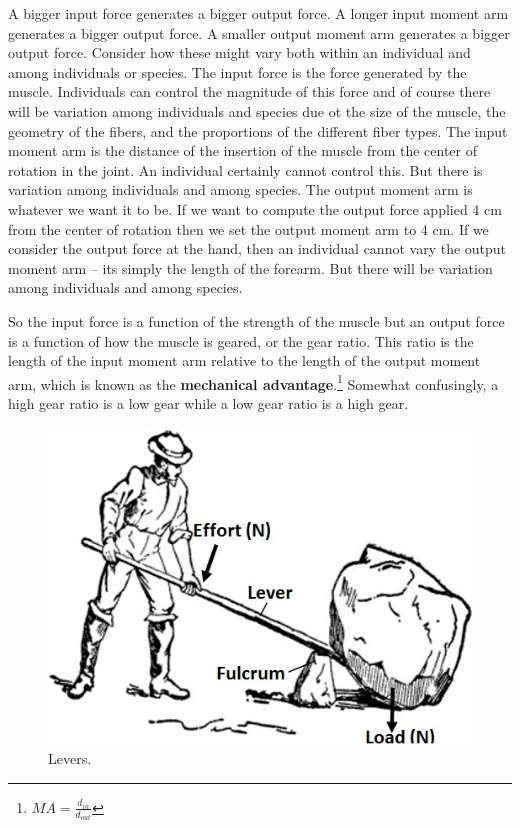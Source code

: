 \documentclass[]{book}
\let\rmarkdownfootnote\footnote%
\def\footnote{\protect\rmarkdownfootnote}
\begin{document}
A bigger input force generates a bigger output force. A longer input
moment arm generates a bigger output force. A smaller output moment arm
generates a bigger output force. Consider how these might vary both
within an individual and among individuals or species. The input force
is the force generated by the muscle. Individuals can control the
magnitude of this force and of course there will be variation among
individuals and species due ot the size of the muscle, the geometry of
the fibers, and the proportions of the different fiber types. The input
moment arm is the distance of the insertion of the muscle from the
center of rotation in the joint. An individual certainly cannot control
this. But there is variation among individuals and among species. The
output moment arm is whatever we want it to be. If we want to compute
the output force applied 4 cm from the center of rotation then we set
the output moment arm to 4 cm. If we consider the output force at the
hand, then an individual cannot vary the output moment arm -- its simply
the length of the forearm. But there will be variation among individuals
and among species.

So the input force is a function of the strength of the muscle but an
output force is a function of how the muscle is geared, or the gear
ratio. This ratio is the length of the input moment arm relative to the
length of the output moment arm, which is known as the
\textbf{mechanical advantage}.\footnote{\(MA=\frac{d_{in}}{d_{out}}\)}
Somewhat confusingly, a high gear ratio is a low gear while a low gear
ratio is a high gear.

\begin{figure}
\includegraphics[width=7in]{images/gear_chapter/leverage} \caption{Levers.}\label{fig:rock1}
\end{figure}
\end{document}
